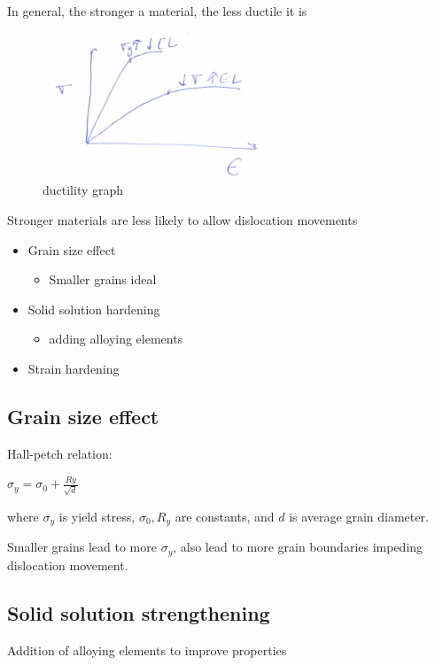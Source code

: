 \documentclass{article}
\begin{document}
In general, the stronger a material, the less ductile it is
\begin{figure}[h!]
	\centering
	\includegraphics[width=0.66\textwidth]{assets/7ad81afb.png}
	\caption{ductility graph}
\end{figure}

Stronger materials are less likely to allow dislocation movements
\begin{itemize}
    \item Grain size effect
    \begin{itemize}
        \item Smaller grains ideal
    \end{itemize}
    \item Solid solution hardening
    \begin{itemize}
        \item adding alloying elements
    \end{itemize}
    \item Strain hardening
\end{itemize}

\subsection{Grain size effect}
Hall-petch relation:

$\sigma_y = \sigma_0 + \frac{Ry}{\sqrt{d}}$

where $\sigma_y$ is yield stress, $\sigma_0, R_y$ are constants, and $d$ is average grain diameter.

Smaller grains lead to more $\sigma_y$, also lead to more grain boundaries impeding dislocation movement.

\subsection{Solid solution strengthening}

Addition of alloying elements to improve properties
\end{document}
